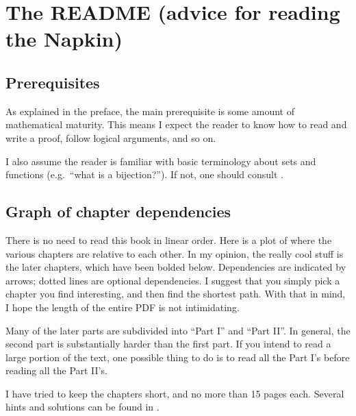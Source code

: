 \addtocounter{chapter}{-1}
\chapter{The README (advice for reading the Napkin)}
\section{Prerequisites}
As explained in the preface,
the main prerequisite is some amount of mathematical maturity.
This means I expect the reader to know how
to read and write a proof, follow logical arguments, and so on.

I also assume the reader is familiar with basic terminology
about sets and functions (e.g.\ ``what is a bijection?'').
If not, one should consult .

\section{Graph of chapter dependencies}
There is no need to read this book in linear order.
Here is a plot of where the various chapters are relative to each other.
In my opinion, the really cool stuff is the later chapters,
which have been bolded below.
Dependencies are indicated by arrows;
dotted lines are optional dependencies.
I suggest that you simply pick a chapter you find interesting,
and then find the shortest path.
With that in mind, I hope the length of the entire PDF is not intimidating.

Many of the later parts are subdivided into ``Part I'' and ``Part II''.
In general, the second part is substantially harder than the first part.
If you intend to read a large portion of the text,
one possible thing to do is to read all the Part I's
before reading all the Part II's.

I have tried to keep the chapters short, and no more than 15 pages each.
Several hints and solutions can be found in .


